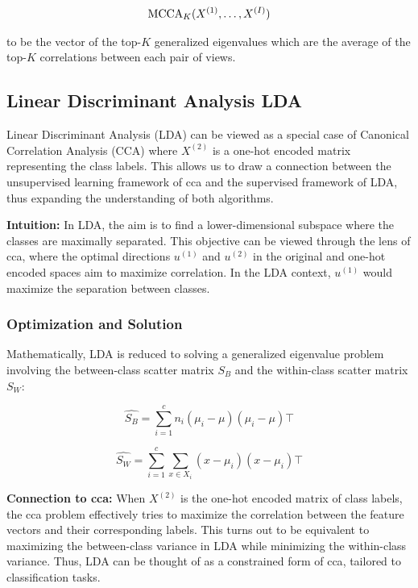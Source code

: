 \begin{align}
    \operatorname{MCCA}_K(X^{(1)},\dots,X^{(I)})
\end{align}

to be the vector of the top-$K$ generalized eigenvalues which are the average of the top-$K$ correlations between each pair of views.

\subsection{Linear Discriminant Analysis LDA}

Linear Discriminant Analysis (LDA) can be viewed as a special case of Canonical Correlation Analysis (CCA) where \(X^{(2)}\) is a one-hot encoded matrix representing the class labels.
This allows us to draw a connection between the unsupervised learning framework of \acrshort{cca} and the supervised framework of LDA\citep{balakrishnama1998linear,riffenburgh1957linear}, thus expanding the understanding of both algorithms.

\textbf{Intuition:} In LDA, the aim is to find a lower-dimensional subspace where the classes are maximally separated. This objective can be viewed through the lens of \acrshort{cca}, where the optimal directions \(u^{(1)}\) and \(u^{(2)}\) in the original and one-hot encoded spaces aim to maximize correlation. In the LDA context, \(u^{(1)}\) would maximize the separation between classes.

\subsubsection{Optimization and Solution}

Mathematically, LDA is reduced to solving a generalized eigenvalue problem involving the between-class scatter matrix \(S_B\) and the within-class scatter matrix \(S_W\):

\[
    \hat{S_B} = \sum_{i=1}^{c} n_i (\mu_i - \mu)(\mu_i - \mu)\top
\]

\[
    \hat{S_W} = \sum_{i=1}^{c} \sum_{x \in X_i} (x - \mu_i)(x - \mu_i)\top
\]

\textbf{Connection to \acrshort{cca}:} When \(X^{(2)}\) is the one-hot encoded matrix of class labels, the \acrshort{cca} problem effectively tries to maximize the correlation between the feature vectors and their corresponding labels.
This turns out to be equivalent to maximizing the between-class variance in LDA while minimizing the within-class variance.
Thus, LDA can be thought of as a constrained form of \acrshort{cca}, tailored to classification tasks.

